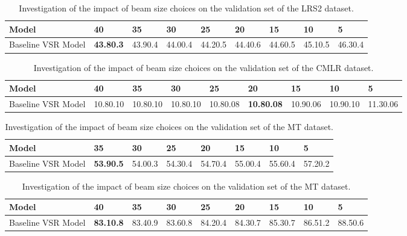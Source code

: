 \documentclass[twocolumn]{article}
\begin{document}
\begin{table*}[!t]
\caption{Investigation of the impact of beam size choices on the validation set of the LRS2 dataset.}
\renewcommand\arraystretch{1.05}
\begin{tabularx}{2\columnwidth}{o  k  k  k  k  k  k  k  k}
\toprule
Model &\bf 40 &35 &30 &25 &20 &15 &10 &5  \\ \midrule
Baseline VSR Model &\bf 43.80.3 &43.90.4 &44.00.4 &44.20.5 &44.40.6 &44.60.5 &45.10.5 &46.30.4 \\
\bottomrule
\end{tabularx}
\label{tab: ablation_study_english}
\end{table*} \begin{table*}[!t]
\caption{Investigation of the impact of beam size choices on the validation set of the CMLR dataset.}
\renewcommand\arraystretch{1.05}
\begin{tabularx}{2\columnwidth}{o  k  k  k  k  k  k  k  k}
\toprule
Model &40 &35 &30 &25 &\bf 20 &15 &10 &5  \\ \midrule
Baseline VSR Model &10.80.10 &10.80.10 &10.80.10 &10.80.08 &\bf 10.80.08 &10.90.06 &10.90.10 &11.30.06 \\
\bottomrule
\end{tabularx}
\label{tab: ablation_study_mandarin}
\end{table*} \begin{table*}[!t]
\caption{Investigation of the impact of beam size choices on the validation set of the MT dataset.}
\renewcommand\arraystretch{1.05}
\begin{tabularx}{2\columnwidth}{o k  k  k  k  k  k  k}
\toprule
Model &\bf 35 &30 &25 &20 &15 &10 &5  \\ \midrule
Baseline VSR Model &\bf 53.90.5 &54.00.3 &54.30.4 &54.70.4 &55.00.4 &55.60.4 &57.20.2 \\
\bottomrule
\end{tabularx}
\label{tab: ablation_study_spanish}
\end{table*} \begin{table*}[!t]
\caption{Investigation of the impact of beam size choices on the validation set of the MT dataset.}
\renewcommand\arraystretch{1.05}
\begin{tabularx}{2\columnwidth}{o  k  k  k  k  k  k  k  k}
\toprule
Model &\bf 40 &35 &30 &25 &20 &15 &10 &5
\\ \midrule
Baseline VSR Model &\bf 83.10.8 &83.40.9 &83.60.8 &84.20.4 &84.30.7 &85.30.7 &86.51.2 &88.50.6
\\
\bottomrule

\end{tabularx}
\end{table*}
\end{document}
